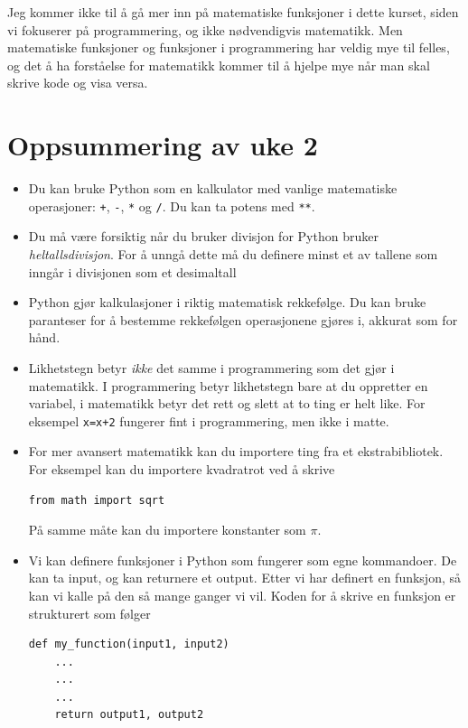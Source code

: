 \documentclass[a4paper, 11pt, notitlepage]{article}
\begin{document}
Jeg kommer ikke til å gå mer inn på matematiske funksjoner i dette kurset, siden vi fokuserer på programmering, og ikke nødvendigvis matematikk. Men matematiske funksjoner og funksjoner i programmering har veldig mye til felles, og det å ha forståelse for matematikk kommer til å hjelpe mye når man skal skrive kode og visa versa.


\section*{Oppsummering av uke 2}

\begin{itemize}
	\item Du kan bruke Python som en kalkulator med vanlige matematiske operasjoner: \verb!+!, \verb!-!, \verb!*! og  \verb!/!. Du kan ta potens med \verb!**!.
	\item Du må være forsiktig når du bruker divisjon for Python bruker \emph{heltalls\-divisjon}. For å unngå dette må du definere minst et av tallene som inngår i divisjonen som et desimaltall
	\item Python gjør kalkulasjoner i riktig matematisk rekkefølge. Du kan bruke paranteser for å bestemme rekkefølgen operasjonene gjøres i, akkurat som for hånd.
	\item Likhetstegn betyr \emph{ikke} det samme i programmering som det gjør i matematikk. I programmering betyr likhetstegn bare at du oppretter en variabel, i matematikk betyr det rett og slett at to ting er helt like. For eksempel \verb!x=x+2! fungerer fint i programmering, men ikke i matte.
	\item For mer avansert matematikk kan du importere ting fra et ekstrabibliotek. For eksempel kan du importere kvadratrot ved å skrive \begin{lstlisting}
from math import sqrt
	\end{lstlisting} På samme måte kan du importere konstanter som $\pi$.
	\item Vi kan definere funksjoner i Python som fungerer som egne kommandoer. De kan ta input, og kan returnere et output. Etter vi har definert en funksjon, så kan vi kalle på den så mange ganger vi vil. Koden for å skrive en funksjon er strukturert som følger
\begin{lstlisting}
def my_function(input1, input2)
	...
	...
	...
	return output1, output2
\end{lstlisting}

\end{itemize}
\end{document}
